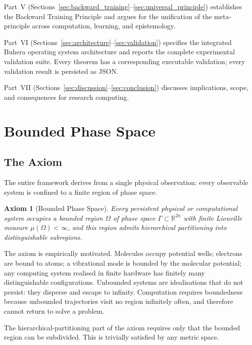 \documentclass[twocolumn,11pt,a4paper]{article}
\newtheorem{axiom}{Axiom}
\begin{document}
Part~V (Sections~\ref{sec:backward_training}--\ref{sec:universal_principle}) establishes the Backward Training Principle and argues for the unification of the meta-principle across computation, learning, and epistemology.

Part~VI (Sections~\ref{sec:architecture}--\ref{sec:validation}) specifies the integrated Buhera operating system architecture and reports the complete experimental validation suite. Every theorem has a corresponding executable validation; every validation result is persisted as JSON.

Part~VII (Sections~\ref{sec:discussion}--\ref{sec:conclusion}) discusses implications, scope, and consequences for research computing.


\section{Bounded Phase Space}
\label{sec:bounded_phase_space}

\subsection{The Axiom}

The entire framework derives from a single physical observation: every observable system is confined to a finite region of phase space.

\begin{axiom}[Bounded Phase Space]
\label{ax:bounded}
Every persistent physical or computational system occupies a bounded region $\Omega$ of phase space $\Gamma \subset \mathbb{R}^{2n}$ with finite Liouville measure $\mu(\Omega) < \infty$, and this region admits hierarchical partitioning into distinguishable subregions.
\end{axiom}

The axiom is empirically motivated. Molecules occupy potential wells; electrons are bound to atoms; a vibrational mode is bounded by the molecular potential; any computing system realised in finite hardware has finitely many distinguishable configurations. Unbounded systems are idealisations that do not persist: they disperse and escape to infinity. Computation requires boundedness because unbounded trajectories visit no region infinitely often, and therefore cannot return to solve a problem.

The hierarchical-partitioning part of the axiom requires only that the bounded region can be subdivided. This is trivially satisfied by any metric space.
\end{document}
